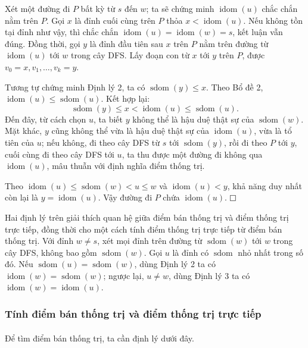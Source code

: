 \documentclass[11pt]{article}
\newcommand{\proofbox}{\ensuremath{\vcenter{\hrule height 0.45pt
  \hbox{\vrule width 0.45pt height 6pt\kern 6pt\vrule width 0.45pt}
  \hrule height 0.45pt}}}
\begin{document}
Xét một đường đi \(P\) bất kỳ từ \(s\) đến \(w\); ta sẽ chứng minh
\(\operatorname{idom}(u)\) chắc chắn nằm trên \(P\). Gọi \(x\) là đỉnh cuối
cùng trên \(P\) thỏa \(x<\operatorname{idom}(u)\). Nếu không tồn tại đỉnh như
vậy, thì chắc chắn \(\operatorname{idom}(u)=\operatorname{idom}(w)=s\), kết
luận vẫn đúng. Đồng thời, gọi \(y\) là đỉnh đầu tiên sau \(x\) trên \(P\) nằm
trên đường từ \(\operatorname{idom}(u)\) tới \(w\) trong cây DFS. Lấy đoạn con
từ \(x\) tới \(y\) trên \(P\), được \(v_0=x,v_1,\ldots,v_k=y\).

Tương tự chứng minh Định lý 2, ta có \(\operatorname{sdom}(y)\le x\). Theo Bổ
đề 2, \(\operatorname{idom}(u)\le \operatorname{sdom}(u)\). Kết hợp lại:
\[
\operatorname{sdom}(y)\le x<\operatorname{idom}(u)\le \operatorname{sdom}(u).
\]
Đến đây, từ cách chọn \(u\), ta biết \(y\) không thể là hậu duệ thật sự của
\(\operatorname{sdom}(w)\). Mặt khác, \(y\) cũng không thể vừa là hậu duệ thật
sự của \(\operatorname{idom}(u)\), vừa là tổ tiên của \(u\); nếu không, đi theo
cây DFS từ \(s\) tới \(\operatorname{sdom}(y)\), rồi đi theo \(P\) tới \(y\),
cuối cùng đi theo cây DFS tới \(u\), ta thu được một đường đi không qua
\(\operatorname{idom}(u)\), mâu thuẫn với định nghĩa điểm thống trị.

Theo \(\operatorname{idom}(u)\le \operatorname{sdom}(w)<u\le w\) và
\(\operatorname{idom}(u)<y\), khả năng duy nhất còn lại là
\(y=\operatorname{idom}(u)\). Vậy đường đi \(P\) chứa \(\operatorname{idom}(u)\).
\proofbox

Hai định lý trên giải thích quan hệ giữa điểm bán thống trị và điểm thống trị
trực tiếp, đồng thời cho một cách tính điểm thống trị trực tiếp từ điểm bán
thống trị. Với đỉnh \(w\ne s\), xét mọi đỉnh trên đường từ
\(\operatorname{sdom}(w)\) tới \(w\) trong cây DFS, không bao gồm
\(\operatorname{sdom}(w)\). Gọi \(u\) là đỉnh có \(\operatorname{sdom}\) nhỏ
nhất trong số đó. Nếu \(\operatorname{sdom}(u)=\operatorname{sdom}(w)\), dùng
Định lý 2 ta có \(\operatorname{idom}(w)=\operatorname{sdom}(w)\); ngược lại,
\(u\ne w\), dùng Định lý 3 ta có
\(\operatorname{idom}(w)=\operatorname{idom}(u)\).

\subsubsection{Tính điểm bán thống trị và điểm thống trị trực tiếp}

\paragraph{}
Để tìm điểm bán thống trị, ta cần định lý dưới đây.
\end{document}
